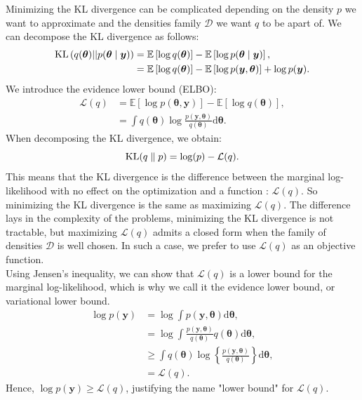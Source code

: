 \documentclass{article}
\DeclareMathOperator*{\KL}{{\rm KL}}
\begin{document}
Minimizing the KL divergence can be complicated depending on the density $p$ we want to approximate and the densities family $\mathcal{D}$ we want $q$ to be apart of. We can decompose the KL divergence as follows:
\begin{align*}
\KL\left(q(\boldsymbol{\theta})||p(\boldsymbol{\theta}\mid \boldsymbol{y})\right) &= \mathbb{E}\left[\log q(\boldsymbol{\theta})\right] - \mathbb{E}\left[\log p(\boldsymbol{\theta}\mid \boldsymbol{y})\right],\\
&= \mathbb{E}\left[\log q(\boldsymbol{\theta})\right] - \mathbb{E}\left[\log p(\boldsymbol{y},\boldsymbol{\theta})\right] + \log p(\boldsymbol{y}).
\end{align*}
We introduce the evidence lower bound (\small{ELBO}):
\begin{align*}
\mathcal{L}(q) &= \mathbb{E}\left[\log p(\boldsymbol{\theta},\boldsymbol{y})\right] - \mathbb{E}\left[\log q(\boldsymbol{\theta})\right],\\
&=\int q(\boldsymbol{\theta})\log\frac{p(\boldsymbol{y},\boldsymbol{\theta})}{q(\boldsymbol{\theta})}\mathrm{d}\boldsymbol{\theta}.
\end{align*}
When decomposing the KL divergence, we obtain:
\begin{equation*}
\KL(q\parallel p) = \log(p) - \mathcal{L}(q).
\end{equation*}
This means that the KL divergence is the difference between the marginal log-likelihood with no effect on the optimization and a function : $\mathcal{L}(q)$. So minimizing the KL divergence is the same as maximizing $\mathcal{L}(q)$. The difference lays in the complexity of the problems, minimizing the KL divergence is not tractable, but maximizing $\mathcal{L}(q)$ admits a closed form when the family of densities $\mathcal{D}$ is well chosen. In such a case, we prefer to use $\mathcal{L}(q)$ as an objective function.\\
\newline
%
Using Jensen's inequality, we can show that $\mathcal{L}(q)$ is a lower bound for the marginal log-likelihood, which is why we call it the evidence lower bound, or variational lower bound.
\begin{align*}
\log p(\boldsymbol{y}) &= \log \int p(\boldsymbol{y}, \boldsymbol{\theta}) \mathrm{d}\boldsymbol{\theta},\\
&= \log \int \frac{p(\boldsymbol{y}, \boldsymbol{\theta})}{q(\boldsymbol{\theta})}q(\boldsymbol{\theta})\mathrm{d}\boldsymbol{\theta}
,\\
&\geq \int q(\boldsymbol{\theta}) \log \left\lbrace \frac{p(\boldsymbol{y}, \boldsymbol{\theta})}{q(\boldsymbol{\theta})} \right\rbrace \mathrm{d}\boldsymbol{\theta},\\
&= \mathcal{L}(q).
\end{align*}
Hence, $\log p(\boldsymbol{y}) \geq \mathcal{L}(q)$, justifying the name "lower bound" for $\mathcal{L}(q)$.
%
\end{document}
